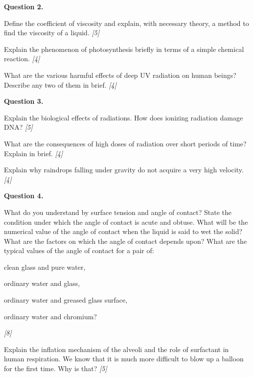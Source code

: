 \documentclass[11pt,a4paper]{article}
\newcommand{\pts}[1]{\hfill   \textit{[#1]}}
\begin{document}
\medskip


\noindent   \textbf{Question 2.}

\begin{parts}
  \item Define the coefficient of viscosity and explain, with necessary theory, a method to find the viscosity of a liquid. \pts{5}
  \item Explain the phenomenon of photosynthesis briefly in terms of a simple chemical reaction. \pts{4}
  \item What are the various harmful effects of deep UV radiation on human beings? Describe any two of them in brief. \pts{4}
\end{parts}

\medskip


\noindent   \textbf{Question 3.}

\begin{parts}
  \item Explain the biological effects of radiations. How does ionizing radiation damage DNA? \pts{5}
  \item What are the consequences of high doses of radiation over short periods of time? Explain in brief. \pts{4}
  \item Explain why raindrops falling under gravity do not acquire a very high velocity. \pts{4}
\end{parts}

\medskip


\noindent   \textbf{Question 4.}

\begin{parts}
  \item What do you understand by surface tension and angle of contact? State the condition under which the angle of contact is acute and obtuse. What will be the numerical value of the angle of contact when the liquid is said to wet the solid? What are the factors on which the angle of contact depends upon? What are the typical values of the angle of contact for a pair of:
    
\begin{parts}
      \item clean glass and pure water,
      \item ordinary water and glass,
      \item ordinary water and greased glass surface,
      \item ordinary water and chromium?
    \end{parts} \pts{8}
  \item Explain the inflation mechanism of the alveoli and the role of surfactant in human respiration. We know that it is much more difficult to blow up a balloon for the first time. Why is that? \pts{5}
\end{parts}
\end{document}
